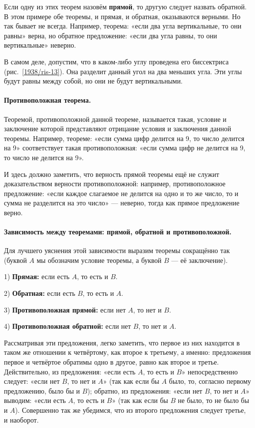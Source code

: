 \documentclass[twoside]{book}
\begin{document}
\medskip

Если одну из этих теорем назовём \textbf{прямой}, то другую следует назвать обратной.
В этом примере обе теоремы, и прямая, и обратная, оказываются верными.
Но так бывает не всегда.
Например, теорема:
«если два угла вертикальные, то они равны» верна, но обратное предложение:
«если два угла равны, то они вертикальные» неверно.

В самом деле, допустим, что в каком-либо углу проведена его биссектриса (рис.~\ref{1938/ris-13}).
Она разделит данный угол на два меньших угла.
Эти углы будут равны между собой, но они не будут вертикальными.

\paragraph{Противоположная теорема.}\label{1938/31}
Теоремой, противоположной данной теореме, называется такая, условие и заключение которой представляют отрицание условия и заключения данной теоремы.
Например, теореме:
«если сумма цифр делится на 9, то число делится на 9» соответствует такая противоположная:
«если сумма цифр не делится на 9, то число не делится на 9».

И здесь должно заметить, что верность прямой теоремы ещё не служит доказательством верности противоположной:
например, противоположное предложение:
«если каждое слагаемое не делится на одно и то же число, то и сумма не разделится на это число» — неверно, тогда как прямое предложение верно.

\paragraph{Зависимость между теоремами: прямой, обратной и противоположной.}\label{1938/32}
Для лучшего уяснения этой зависимости выразим теоремы сокращённо так (буквой $A$ мы обозначим условие теоремы, а буквой $B$ — её заключение).

1) \textbf{Прямая:}
если есть $A$, то есть и $B$.

2) \textbf{Обратная:}
если есть $B$, то есть и $A$.

3) \textbf{Противоположная прямой:}
если нет $A$, то нет и $B$.

4) \textbf{Противоположная обратной:}
если нет $B$, то нет и $A$.

Рассматривая эти предложения, легко заметить, что первое из них находится в таком же отношении к четвёртому, как второе к третьему, а именно:
предложения первое и четвёртое обратимы одно в другое, равно как второе и третье.
Действительно, из предложения:
«если есть $A$, то есть и $B$» непосредственно следует:
«если нет $B$, то нет и $A$» (так как если бы $A$ было, то, согласно первому предложению, было бы и $B$);
обратно, из предложения:
«если нет $B$, то нет и $A$» выводим:
«если есть $A$, то есть и $B$» (так как если бы $B$ не было, то не было бы и $A$).
Совершенно так же убедимся, что из второго предложения следует третье, и наоборот.
\end{document}
